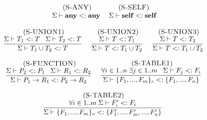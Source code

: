 \begin{figure}[!ht]
\begin{footnotesize}
$$\begin{array}{c}
\begin{array}{c}
\end{array}
\;
\begin{array}{c}
\mylabel{S-ANY}\\
\senv \vdash \Any \subtype \Any
\end{array}
\;
\begin{array}{c}
\mylabel{S-SELF}\\
\senv \vdash \Self \subtype \Self
\end{array}
\\ \\
\begin{array}{c}
\mylabel{S-UNION1}\\
\dfrac{\senv \vdash T_{1} \subtype T \;\;\;
       \senv \vdash T_{2} \subtype T}
      {\senv \vdash T_{1} \cup T_{2} \subtype T}
\end{array}
\;
\begin{array}{c}
\mylabel{S-UNION2}\\
\dfrac{\senv \vdash T \subtype T_{1}}
      {\senv \vdash T \subtype T_{1} \cup T_{2}}
\end{array}
\;
\begin{array}{c}
\mylabel{S-UNION3}\\
\dfrac{\senv \vdash T \subtype T_{2}}
      {\senv \vdash T \subtype T_{1} \cup T_{2}}
\end{array}
\\ \\
\begin{array}{c}
\mylabel{S-FUNCTION}\\
\dfrac{\senv \vdash P_{2} \subtype P_{1} \;\;\;
       \senv \vdash R_{1} \subtype R_{2}}
      {\senv \vdash P_{1} \rightarrow R_{1} \subtype P_{2} \rightarrow R_{2}}
\end{array}
\;
\begin{array}{c}
\mylabel{S-TABLE1}\\
\dfrac{\forall i \in 1..n \; \exists j \in 1..m \;\;\;
       \senv \vdash F_{j} \subtype F_{i}}
      {\senv \vdash \{F_{1}, ..., F_{m}\}_{c} \subtype \{F_{1}, ..., F_{n}\}}
\end{array}
\\ \\
\begin{array}{c}
\mylabel{S-TABLE2}\\
\dfrac{\forall i \in 1..m \; \senv \vdash F_{i}' \subtype F_{i}}
      {\senv \vdash \{F_{1}, ..., F_{m}\}_{o} \subtype \{F_{1}', ..., F_{m}', ..., F_{n}'\}}
\end{array}
\;
\begin{array}{c}

\end{array}
\end{array}$$
\end{footnotesize}
\end{figure}
